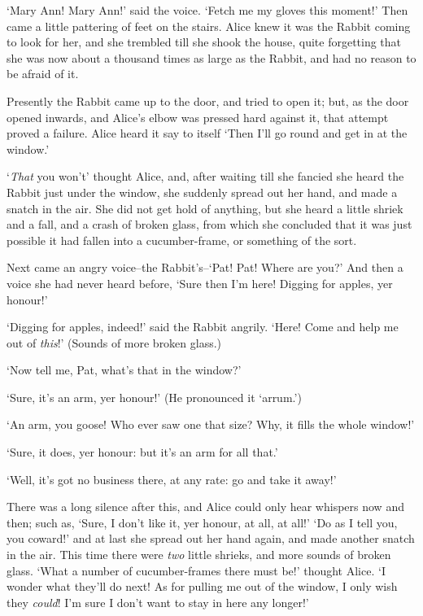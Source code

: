   `Mary Ann!  Mary Ann!' said the voice.  `Fetch me my gloves
this moment!'  Then came a little pattering of feet on the
stairs.  Alice knew it was the Rabbit coming to look for her, and
she trembled till she shook the house, quite forgetting that she
was now about a thousand times as large as the Rabbit, and had no
reason to be afraid of it.

  Presently the Rabbit came up to the door, and tried to open it;
but, as the door opened inwards, and Alice's elbow was pressed
hard against it, that attempt proved a failure.  Alice heard it
say to itself `Then I'll go round and get in at the window.'

  `{\it That} you won't' thought Alice, and, after waiting till she
fancied she heard the Rabbit just under the window, she suddenly
spread out her hand, and made a snatch in the air.  She did not
get hold of anything, but she heard a little shriek and a fall,
and a crash of broken glass, from which she concluded that it was
just possible it had fallen into a cucumber-frame, or something
of the sort.

  Next came an angry voice--the Rabbit's--`Pat! Pat!  Where are
you?'  And then a voice she had never heard before, `Sure then
I'm here!  Digging for apples, yer honour!'

  `Digging for apples, indeed!' said the Rabbit angrily.  `Here!
Come and help me out of {\it this}!'  (Sounds of more broken glass.)

  `Now tell me, Pat, what's that in the window?'

  `Sure, it's an arm, yer honour!'  (He pronounced it `arrum.')

  `An arm, you goose!   Who ever saw one that size?  Why, it
fills the whole window!'

  `Sure, it does, yer honour:  but it's an arm for all that.'

  `Well, it's got no business there, at any rate:  go and take it
away!'

  There was a long silence after this, and Alice could only hear
whispers now and then; such as, `Sure, I don't like it, yer
honour, at all, at all!'  `Do as I tell you, you coward!' and at
last she spread out her hand again, and made another snatch in
the air.  This time there were {\it two} little shrieks, and more
sounds of broken glass.  `What a number of cucumber-frames there
must be!' thought Alice.  `I wonder what they'll do next!  As for
pulling me out of the window, I only wish they {\it could}!  I'm sure I
don't want to stay in here any longer!'

